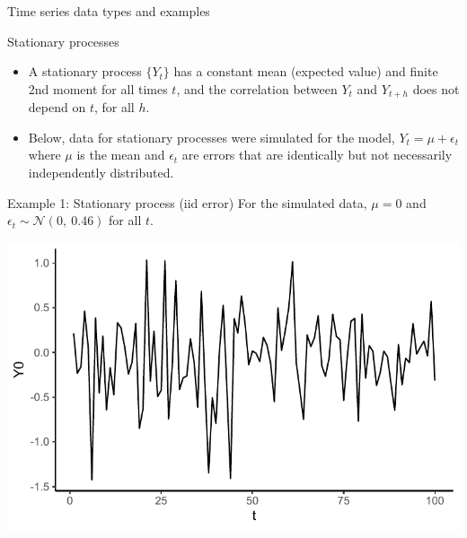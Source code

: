 \documentclass[
  9pt,
  ignorenonframetext,
]{beamer}
\providecommand{\tightlist}{%
  \setlength{\itemsep}{0pt}\setlength{\parskip}{0pt}}
\begin{document}
\begin{frame}{Time series data types and examples}
\begin{block}{Stationary processes}
\protect\hypertarget{stationary-processes}{}
\begin{itemize}
\tightlist
\item
  A stationary process \(\{Y_t\}\) has a constant mean (expected value)
  and finite 2nd moment for all times \(t\), and the correlation between
  \(Y_t\) and \(Y_{t+h}\) does not depend on \(t\), for all \(h\).
\item
  Below, data for stationary processes were simulated for the model,
  \(Y_t = \mu + \epsilon_t\) where \(\mu\) is the mean and
  \(\epsilon_t\) are errors that are identically but not necessarily
  independently distributed.
\end{itemize}
\end{block}

\begin{block}{Example 1: Stationary process (iid error)}
\protect\hypertarget{example-1-stationary-process-iid-error}{}
For the simulated data, \(\mu=0\) and
\(\epsilon_t \sim \mathcal {N} (0,\ 0.46)\) for all \(t\).

\tiny

\begin{center}\includegraphics[width=0.5\linewidth]{figs_L1/stationary-1} \end{center}

\tiny
\end{block}
\end{frame}
\end{document}
